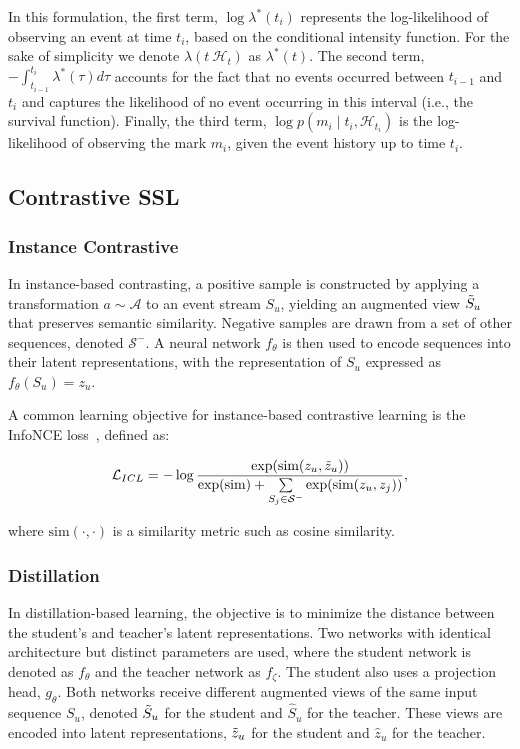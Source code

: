 In this formulation, the first term, $\log \lambda^*(t_i)$ represents the log-likelihood of observing an event at time $t_i$, based on the conditional intensity function. For the sake of simplicity we denote $\lambda(t \ \mathcal{H}_t)$ as $\lambda^*(t)$. The second term, $-\int_{t_{i-1}}^{t_i} \lambda^*(\tau) d\tau$ accounts for the fact that no events occurred between $t_{i-1}$ and $t_i$ and captures the likelihood of no event occurring in this interval (i.e., the survival function). Finally, the third term, $\log p(m_i \mid t_i, \mathcal{H}_{t_i})$ is the log-likelihood of observing the mark $m_i$, given the event history up to time $t_i$.

\subsection{Contrastive SSL}

\subsubsection{Instance Contrastive}
\label{appendix:instance-contrast}

In instance-based contrasting, a positive sample is constructed by applying a transformation $a \sim \mathcal{A}$ to an event stream $S_u$, yielding an augmented view $\Tilde{S}_u$ that preserves semantic similarity. Negative samples are drawn from a set of other sequences, denoted $\mathcal{S}^-$. A neural network $f_\theta$ is then used to encode sequences into their latent representations, with the representation of $S_u$ expressed as $f_\theta(S_u) = z_u$.

A common learning objective for instance-based contrastive learning is the InfoNCE loss~\cite{oord2018representation}, defined as:

$$\mathcal{L}_{ICL} = - \log \frac{\exp(\text{sim}(z_u, \Tilde{z}_u))}{\exp(\text{sim}) + \sum\limits_{S_j \in \mathcal{S}^-} \exp(\text{sim}(z_u, z_j))},$$

where $\text{sim}(\cdot, \cdot)$ is a similarity metric such as cosine similarity.

\subsubsection{Distillation}
\label{appendix:distillation}

In distillation-based learning, the objective is to minimize the distance between the student's and teacher's latent representations.
Two networks with identical architecture but distinct parameters are used, where the student network is denoted as $f_\theta$ and the teacher network as $f_\zeta$. 
The student also uses a projection head, $g_\theta$. 
Both networks receive different augmented views of the same input sequence $S_u$, denoted $\Tilde{S}_u$ for the student and $\hat{S}_u$ for the teacher. These views are encoded into latent representations, $\Tilde{z}_u$ for the student and $\hat{z}_u$ for the teacher.


